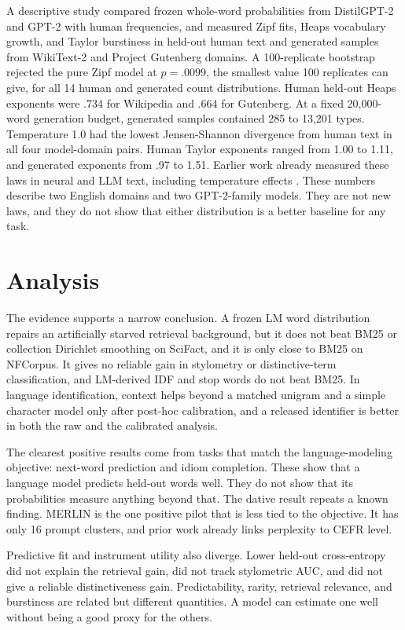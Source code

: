 \documentclass[11pt]{article}
\begin{document}
A descriptive study compared frozen whole-word probabilities from DistilGPT-2
and GPT-2 \citep{radford2019gpt2} with human frequencies, and measured Zipf
fits, Heaps vocabulary growth, and Taylor burstiness in held-out human text and
generated samples from WikiText-2 and Project Gutenberg domains. A
100-replicate bootstrap rejected the pure Zipf model at $p=.0099$, the
smallest value 100 replicates can give, for all 14
human and generated count distributions. Human held-out Heaps exponents were
.734 for Wikipedia and .664 for Gutenberg. At a fixed 20,000-word generation
budget, generated samples contained 285 to 13,201 types. Temperature 1.0 had
the lowest Jensen-Shannon divergence from human text in all four model-domain
pairs. Human Taylor exponents ranged from 1.00 to 1.11, and generated
exponents from .97 to 1.51. Earlier work already measured these laws in
neural and LLM text, including temperature effects
\citep{takahashi2017neural,takahashi2019scaling,mikhaylovskiy2025zipf}. These
numbers describe two English domains and two GPT-2-family models. They are not
new laws, and they do not show that either distribution is a better baseline
for any task.

\section{Analysis}

The evidence supports a narrow conclusion. A frozen LM word distribution
repairs an artificially starved retrieval background, but it does not beat BM25 or
collection Dirichlet smoothing on SciFact, and it is only close to BM25 on
NFCorpus. It gives no reliable gain in stylometry or distinctive-term
classification, and LM-derived IDF and stop words do not beat BM25. In
language identification, context helps beyond a matched unigram and a simple
character model only after post-hoc calibration, and a released identifier is
better in both the raw and the calibrated analysis.

The clearest positive results come from tasks that match the language-modeling
objective: next-word prediction and idiom completion. These show that a language model predicts held-out words
well. They do not show that its probabilities measure anything beyond that.
The dative result repeats a known finding. MERLIN is the one positive pilot
that is less tied to the objective. It has only 16 prompt clusters, and prior
work already links perplexity to CEFR level.

Predictive fit and instrument utility also diverge. Lower held-out
cross-entropy did not explain the retrieval gain, did not track stylometric
AUC, and did not give a reliable distinctiveness gain. Predictability, rarity,
retrieval relevance, and burstiness are related but different quantities. A
model can estimate one well without being a good proxy for the others.
\end{document}
